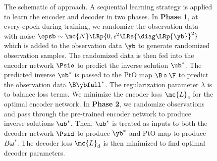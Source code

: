 \begin{figure}[htb!]
{
        }
    \caption{
        The schematic of \TNetAE{} approach. A sequential learning strategy is applied to learn the encoder and decoder in two phases. In {\bf Phase 1}, at every epoch during training, we randomize the observation data with noise  $\epsb \sim \mc{N}\LRp{0, \epsilon^2 \LRs{\boldsymbol{\diag}\LRp{{\yb}}}^2}$ which is added to the observation data $\yb$ to generate randomized observation samples. The randomized data is then fed into the encoder network $\Psie$ to predict the inverse solution $\ub^*$. The predicted inverse $\ub^*$ is passed to the PtO map $\B \circ \F$ to predict the observation data $\B\ybfull^{*}$. The regularization parameter $\lambda$ is to balance loss terms. We minimize the encoder loss $\mc{L}_e$ for the optimal encoder network. In {\bf Phase 2}, we randomize observations and pass through the pre-trained encoder network to produce inverse solutions $\ub^*$. Then, $\ub^*$ is treated as inputs to both the decoder network $\Psid$ to produce $\yb^*$ and PtO map to produce $B\boldsymbol{\omega}^*$. The decoder loss $\mc{L}_d$ is then minimized to find optimal decoder parameters. 
    }
\end{figure}




